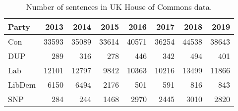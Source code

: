 \begin{table}[!t]

\caption{\label{tab:num_sentences_uk-parlspeech}Number of sentences in UK House of Commons data.}
\centering
\fontsize{10}{12}\selectfont
\begin{tabular}[t]{lrrrrrrr}
\toprule
Party & 2013 & 2014 & 2015 & 2016 & 2017 & 2018 & 2019\\
\midrule
Con & 33593 & 35089 & 33614 & 40571 & 36254 & 44538 & 38643\\
DUP & 289 & 316 & 278 & 446 & 342 & 494 & 401\\
Lab & 12101 & 12797 & 9842 & 10363 & 10216 & 13499 & 11866\\
LibDem & 6150 & 6494 & 2176 & 501 & 591 & 816 & 843\\
SNP & 284 & 244 & 1468 & 2970 & 2445 & 3010 & 2820\\
\bottomrule
\end{tabular}
\end{table}
